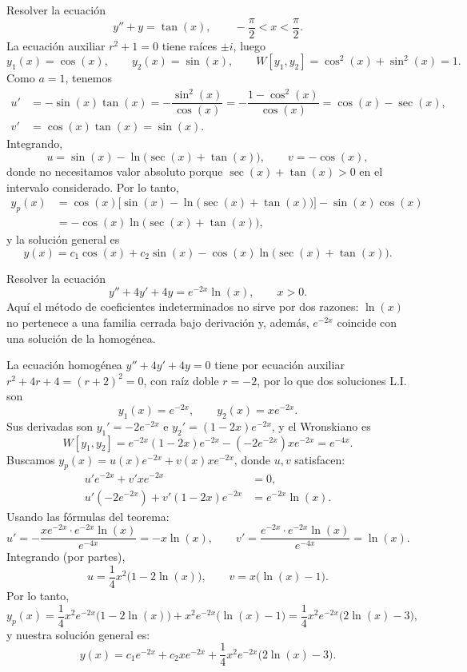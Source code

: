 \begin{example}
    Resolver la ecuaci\'on
    \[
    y''+y=\tan(x),\qquad -\dfrac{\pi}{2}<x<\dfrac{\pi}{2}.
    \]
    La ecuaci\'on auxiliar $r^2+1=0$ tiene ra\'ices $\pm i$, luego
    \[
    y_1(x)=\cos(x),\qquad y_2(x)=\sin(x),\qquad W[y_1,y_2]=\cos^2(x)+\sin^2(x)=1.
    \]
    Como $a=1$, tenemos
    \begin{align*}
    u'&=-\sin(x)\tan(x)=-\dfrac{\sin^2(x)}{\cos(x)}=-\dfrac{1-\cos^2(x)}{\cos(x)}=\cos(x)-\sec(x),\\
    v'&=\cos(x)\tan(x)=\sin(x).
    \end{align*}
    Integrando,
    \[
    u=\sin(x)-\ln\big(\sec(x)+\tan(x)\big),\qquad v=-\cos(x),
    \]
    donde no necesitamos valor absoluto porque $\sec(x)+\tan(x)>0$ en el intervalo considerado. Por lo tanto,
    \begin{align*}
    y_p(x)&=\cos(x)\big[\sin(x)-\ln\big(\sec(x)+\tan(x)\big)\big]-\sin(x)\cos(x)\\
    &=-\cos(x)\ln\big(\sec(x)+\tan(x)\big),
    \end{align*}
    y la soluci\'on general es
    \[
    y(x)=c_1\cos(x)+c_2\sin(x)-\cos(x)\ln\big(\sec(x)+\tan(x)\big).
    \]
\end{example}

\begin{example}
    Resolver la ecuaci\'on
    \[
    y''+4y'+4y=e^{-2x}\ln(x),\qquad x>0.
    \]
    Aqu\'i el m\'etodo de coeficientes indeterminados no sirve por dos razones: $\ln(x)$ no pertenece a una familia cerrada bajo derivaci\'on y, adem\'as, $e^{-2x}$ coincide con una soluci\'on de la homog\'enea.

    La ecuaci\'on homog\'enea $y''+4y'+4y=0$ tiene por ecuaci\'on auxiliar $r^2+4r+4=(r+2)^2=0$, con ra\'iz doble $r=-2$, por lo que dos soluciones L.I. son
    \[
    y_1(x)=e^{-2x},\qquad y_2(x)=xe^{-2x}.
    \]
    Sus derivadas son $y_1'=-2e^{-2x}$ e $y_2'=(1-2x)e^{-2x}$, y el Wronskiano es
    \[
    W[y_1,y_2]=e^{-2x}(1-2x)e^{-2x}-\left(-2e^{-2x}\right)xe^{-2x}=e^{-4x}.
    \]
    Buscamos $y_p(x)=u(x)e^{-2x}+v(x)xe^{-2x}$, donde $u,v$ satisfacen:
    \begin{align*}
        u'e^{-2x}+v'xe^{-2x}&=0,\\
        u'\left(-2e^{-2x}\right)+v'(1-2x)e^{-2x}&=e^{-2x}\ln(x).
    \end{align*}
    Usando las f\'ormulas del teorema:
    \[
    u'=-\dfrac{xe^{-2x}\cdot e^{-2x}\ln(x)}{e^{-4x}}=-x\ln(x),\qquad v'=\dfrac{e^{-2x}\cdot e^{-2x}\ln(x)}{e^{-4x}}=\ln(x).
    \]
    Integrando (por partes),
    \[
    u=\dfrac{1}{4}x^2\big(1-2\ln(x)\big),\qquad v=x\big(\ln(x)-1\big).
    \]
    Por lo tanto,
    \[
    y_p(x)=\dfrac{1}{4}x^2e^{-2x}\big(1-2\ln(x)\big)+x^2e^{-2x}\big(\ln(x)-1\big)=\dfrac{1}{4}x^2e^{-2x}\big(2\ln(x)-3\big),
    \]
    y nuestra soluci\'on general es:
    \[
    y(x)=c_1e^{-2x}+c_2xe^{-2x}+\dfrac{1}{4}x^2e^{-2x}\big(2\ln(x)-3\big).
    \]
\end{example}

